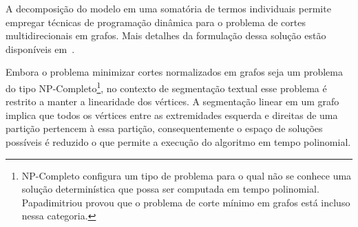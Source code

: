 A decomposição do modelo em uma somatória de termos individuais permite empregar técnicas de programação dinâmica para o problema de cortes multidirecionais em grafos. Mais detalhes da formulação dessa solução estão disponíveis em~\cite{Malioutov:2006a}.

Embora o problema minimizar cortes normalizados em grafos seja um problema do tipo NP-Completo\footnote{NP-Completo configura um tipo de problema para o qual não se conhece uma solução determinística que possa ser computada em tempo polinomial. Papadimitriou provou que o problema de corte mínimo em grafos está incluso nessa categoria.}, no contexto de segmentação textual esse problema é restrito a manter a linearidade dos vértices. A segmentação linear em um grafo implica que todos os vértices entre as extremidades esquerda e direitas de uma partição pertencem à essa partição, consequentemente o espaço de soluções possíveis é reduzido o que permite a execução do algoritmo em tempo polinomial.  

















 
